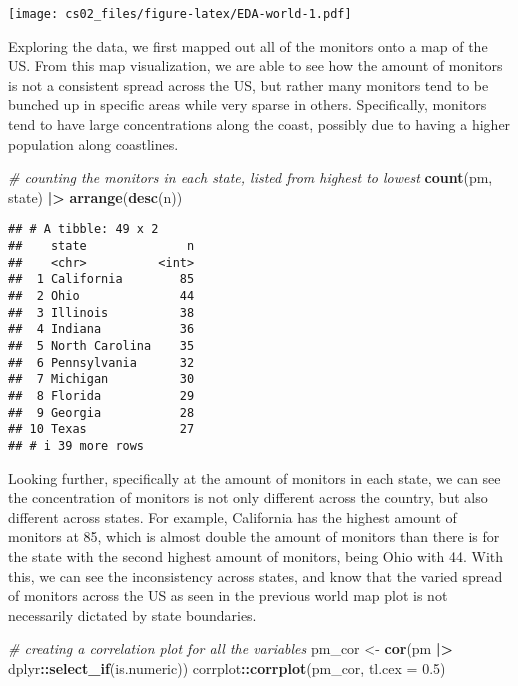 \documentclass[
]{article}
\newenvironment{Shaded}{\begin{snugshade}}{\end{snugshade}}
\newcommand{\AttributeTok}[1]{\textcolor[rgb]{0.13,0.29,0.53}{#1}}
\newcommand{\CommentTok}[1]{\textcolor[rgb]{0.56,0.35,0.01}{\textit{#1}}}
\newcommand{\FloatTok}[1]{\textcolor[rgb]{0.00,0.00,0.81}{#1}}
\newcommand{\FunctionTok}[1]{\textcolor[rgb]{0.13,0.29,0.53}{\textbf{#1}}}
\newcommand{\NormalTok}[1]{#1}
\newcommand{\OtherTok}[1]{\textcolor[rgb]{0.56,0.35,0.01}{#1}}
\newcommand{\SpecialCharTok}[1]{\textcolor[rgb]{0.81,0.36,0.00}{\textbf{#1}}}
\begin{document}
\texttt{[image: cs02\_files/figure-latex/EDA-world-1.pdf]}

Exploring the data, we first mapped out all of the monitors onto a map
of the US. From this map visualization, we are able to see how the
amount of monitors is not a consistent spread across the US, but rather
many monitors tend to be bunched up in specific areas while very sparse
in others. Specifically, monitors tend to have large concentrations
along the coast, possibly due to having a higher population along
coastlines.

\begin{Shaded}
\begin{Highlighting}[]
\CommentTok{\# counting the monitors in each state, listed from highest to lowest}
\FunctionTok{count}\NormalTok{(pm, state) }\SpecialCharTok{|\textgreater{}}
  \FunctionTok{arrange}\NormalTok{(}\FunctionTok{desc}\NormalTok{(n))}
\end{Highlighting}
\end{Shaded}

\begin{verbatim}
## # A tibble: 49 x 2
##    state              n
##    <chr>          <int>
##  1 California        85
##  2 Ohio              44
##  3 Illinois          38
##  4 Indiana           36
##  5 North Carolina    35
##  6 Pennsylvania      32
##  7 Michigan          30
##  8 Florida           29
##  9 Georgia           28
## 10 Texas             27
## # i 39 more rows
\end{verbatim}

Looking further, specifically at the amount of monitors in each state,
we can see the concentration of monitors is not only different across
the country, but also different across states. For example, California
has the highest amount of monitors at 85, which is almost double the
amount of monitors than there is for the state with the second highest
amount of monitors, being Ohio with 44. With this, we can see the
inconsistency across states, and know that the varied spread of monitors
across the US as seen in the previous world map plot is not necessarily
dictated by state boundaries.

\begin{Shaded}
\begin{Highlighting}[]
\CommentTok{\# creating a correlation plot for all the variables}
\NormalTok{pm\_cor }\OtherTok{\textless{}{-}} \FunctionTok{cor}\NormalTok{(pm }\SpecialCharTok{|\textgreater{}}\NormalTok{ dplyr}\SpecialCharTok{::}\FunctionTok{select\_if}\NormalTok{(is.numeric))}
\NormalTok{corrplot}\SpecialCharTok{::}\FunctionTok{corrplot}\NormalTok{(pm\_cor, }\AttributeTok{tl.cex =} \FloatTok{0.5}\NormalTok{)}
\end{Highlighting}
\end{Shaded}
\end{document}
